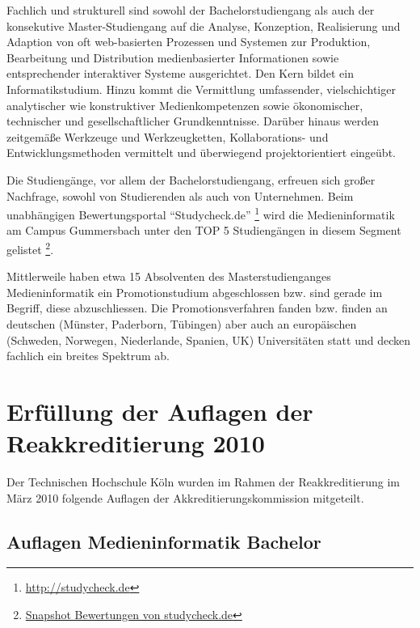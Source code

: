 Fachlich und strukturell sind sowohl der Bachelorstudiengang als auch
der konsekutive Master-Studiengang auf die Analyse, Konzeption,
Realisierung und Adaption von oft web-basierten Prozessen und Systemen
zur Produktion, Bearbeitung und Distribution medienbasierter
Informationen sowie entsprechender interaktiver Systeme ausgerichtet.
Den Kern bildet ein Informatikstudium. Hinzu kommt die Vermittlung
umfassender, vielschichtiger analytischer wie konstruktiver
Medienkompetenzen sowie ökonomischer, technischer und gesellschaftlicher
Grundkenntnisse. Darüber hinaus werden zeitgemäße Werkzeuge und
Werkzeugketten, Kollaborations- und Entwicklungsmethoden vermittelt und
überwiegend projektorientiert eingeübt.

Die Studiengänge, vor allem der Bachelorstudiengang, erfreuen sich
großer Nachfrage, sowohl von Studierenden als auch von Unternehmen. Beim
unabhängigen Bewertungsportal ``Studycheck.de'' \footnote{\url{http://studycheck.de}}
wird die Medieninformatik am Campus Gummersbach unter den TOP 5
Studiengängen in diesem Segment gelistet \footnote{\href{https://th-koeln.github.io/mi-2017/anhaenge/eva-snapshot_2017_02_17_bewertungen_studiengang_medieninformatik_auf_studycheck_._de.pdf}{Snapshot
  Bewertungen von studycheck.de}}.

Mittlerweile haben etwa 15 Absolventen des Masterstudienganges
Medieninformatik ein Promotionstudium abgeschlossen bzw. sind gerade im
Begriff, diese abzuschliessen. Die Promotionsverfahren fanden bzw.
finden an deutschen (Münster, Paderborn, Tübingen) aber auch an
europäischen (Schweden, Norwegen, Niederlande, Spanien, UK)
Universitäten statt und decken fachlich ein breites Spektrum ab.

\section{Erfüllung der Auflagen der Reakkreditierung
2010\label{/mi-2017/selbstbericht/0100-ist-zustand/0100-ist-zustand}}\label{erfuxfcllung-der-auflagen-der-reakkreditierung-2010pathlabelmi-2017selbstbericht0100-ist-zustand0100-ist-zustand}

Der Technischen Hochschule Köln wurden im Rahmen der Reakkreditierung im
März 2010 folgende Auflagen der Akkreditierungskommission mitgeteilt.

\subsection{Auflagen Medieninformatik
Bachelor\label{/mi-2017/selbstbericht/0100-ist-zustand/0100-ist-zustand}}\label{auflagen-medieninformatik-bachelorpathlabelmi-2017selbstbericht0100-ist-zustand0100-ist-zustand}

